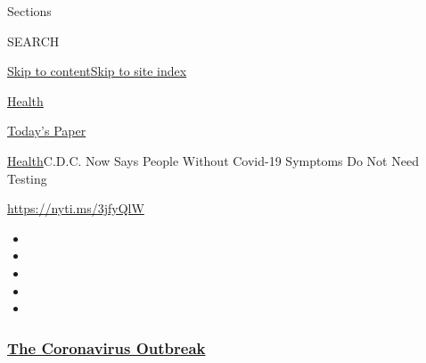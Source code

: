 Sections

SEARCH

\protect\hyperlink{site-content}{Skip to
content}\protect\hyperlink{site-index}{Skip to site index}

\href{https://www.nytimes3xbfgragh.onion/section/health}{Health}

\href{https://myaccount.nytimes3xbfgragh.onion/auth/login?response_type=cookie\&client_id=vi}{}

\href{https://www.nytimes3xbfgragh.onion/section/todayspaper}{Today's
Paper}

\href{/section/health}{Health}\textbar{}C.D.C. Now Says People Without
Covid-19 Symptoms Do Not Need Testing

\url{https://nyti.ms/3jfyQlW}

\begin{itemize}
\item
\item
\item
\item
\item
\end{itemize}

\hypertarget{the-coronavirus-outbreak}{%
\subsubsection{\texorpdfstring{\href{https://www.nytimes3xbfgragh.onion/news-event/coronavirus?name=styln-coronavirus-national\&region=TOP_BANNER\&block=storyline_menu_recirc\&action=click\&pgtype=Article\&impression_id=794551c0-f4b7-11ea-afc5-9fc35eb33fa0\&variant=undefined}{The
Coronavirus
Outbreak}}{The Coronavirus Outbreak}}\label{the-coronavirus-outbreak}}

